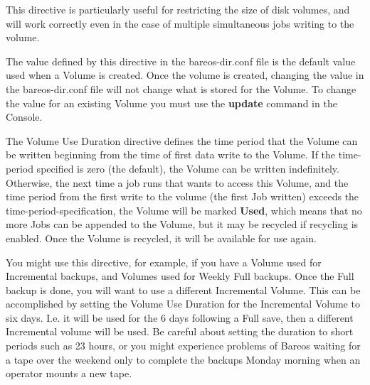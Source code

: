 \begin{description}
{This directive is particularly useful for restricting the size
of disk volumes, and will work correctly even in the case of
multiple simultaneous jobs writing to the volume.

The value defined by this directive in the bareos-dir.conf file is the
default value used when a Volume is created.  Once the volume is
created, changing the value in the bareos-dir.conf file will not change
what is stored for the Volume.  To change the value for an existing
Volume you must use the {\bf update} command in the Console.
}

{The Volume Use Duration directive defines the time period that the
Volume can be written beginning from the time of first data write to the
Volume.  If the time-period specified is zero (the default), the Volume
can be written indefinitely.  Otherwise, the next time a job
runs that wants to access this Volume, and the time period from the
first write to the volume (the first Job written) exceeds the
time-period-specification, the Volume will be marked {\bf Used}, which
means that no more Jobs can be appended to the Volume, but it may be
recycled if recycling is enabled.
Once the Volume is
recycled, it will be available for use again.

You might use this directive, for example, if you have a Volume used for
Incremental backups, and Volumes used for Weekly Full backups.  Once the
Full backup is done, you will want to use a different Incremental
Volume.  This can be accomplished by setting the Volume Use Duration for
the Incremental Volume to six days.  I.e.  it will be used for the 6
days following a Full save, then a different Incremental volume will be
used.  Be careful about setting the duration to short periods such as 23
hours, or you might experience problems of Bareos waiting for a tape
over the weekend only to complete the backups Monday morning when an
operator mounts a new tape.


}
\end{description}
